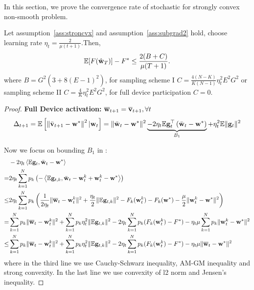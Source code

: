 
In this section, we prove the convergence rate of stochastic for strongly convex
non-smooth problem.


\begin{theorem}
	Let assumption~\ref{ass:stroncvx} and assumption~\ref{ass:subgrad2} hold, choose learning rate $\eta_t = \frac{2}{\mu(t+1)} $.Then,
	\begin{align}
		\mathbb{E}[F(\hat{{\mathbf{w}}}_T)] - F^* \leq \frac{2(B + C)}{\mu(T+1)}.
	\end{align}
	where $B =  G^2 (3  + 8 (E-1)^2)$, for sampling scheme I $C =\frac{4(N - K)}{K(N-1)} \eta_t^2 E^2G^2 $ or
sampling scheme II $C = \frac{4}{K} \eta_t^2 E^2G^2$, for full device participation $C= 0$.
\end{theorem}


\begin{proof}

\textbf{Full Device activation: }  ${\overline{\mathbf{w}}}_{t+1} = {\overline{\mathbf{v}}}_{t+1}, \forall t$ 
\begin{align}
\Delta_{t+1} = \mathbb{E}\left[\left\|\bar{{\mathbf{v}}}_{t+1}-{\mathbf{w}}^{*}\right\|^2| {\mathbf{w}}_{t}\right]=\|\bar{{\mathbf{w}}}_{t}-{\mathbf{w}}^{*}\|^{2} \underbrace{ - 2 \eta_{t} \mathbb{E} {\mathbf{g}}_{t}^{\top}\left(\bar{{\mathbf{w}}}_{t}-{\mathbf{w}}^{*}\right)}_{B_1} + \eta_{t}^{2} \mathbb{E}\| {\mathbf{g}}_{t} \|^{2}	
\label{eq:expand2}
\end{align}


Now we focus on bounding $B_1$ in \eq{\ref{eq:expand}}: 
\begin{align}
	& -2 \eta_{t} \left<\mathbb{E} {\mathbf{g}}_{t}, \bar{{\mathbf{w}}}_{t}-{\mathbf{w}}^{*} \right>\\
  = & 2 \eta_{t} \sum_{k=1}^N p_k \left(-\left<\mathbb{E} {\mathbf{g}}_{t,k}, \bar{{\mathbf{w}}}_{t}-{\mathbf{w}}_t^k + {\mathbf{w}}_t^k - {\mathbf{w}}^{*} \right> \right) \\
  \leq& 2 \eta_{t} \sum_{k=1}^N p_k  \left(\frac{1}{2\eta_t} \|\overline{{\mathbf{w}}}_t - {\mathbf{w}}_t^k\|^2 + \frac{\eta_t}{2} \|\mathbb{E} {\mathbf{g}}_{t,k}\|^2 - F_k({\mathbf{w}}_t^k) - F_k({\mathbf{w}}^*) - \frac{\mu}{2} \|{\mathbf{w}}_t^k - {\mathbf{w}}^*\|^2 \right) \\
  =& \sum_{k=1}^N p_k \|\overline{{\mathbf{w}}}_t - {\mathbf{w}}_t^k\|^2 +  \sum_{k=1}^N p_k \eta_t^2 \|\mathbb{E} {\mathbf{g}}_{t,k}\|^2 
  - 2\eta_t\sum_{k=1}^N p_k (F_k({\mathbf{w}}_t^k) - F^*) - \eta_t \mu \sum_{k=1}^N p_k \|{\mathbf{w}}_t^k - {\mathbf{w}}^*\|^2 \\
  \leq & \sum_{k=1}^N p_k \|\overline{{\mathbf{w}}}_t - {\mathbf{w}}_t^k\|^2 +  \sum_{k=1}^N p_k \eta_t^2 \|\mathbb{E} {\mathbf{g}}_{t,k}\|^2 
  - 2\eta_t\sum_{k=1}^N p_k (F_k({\mathbf{w}}_t^k) - F^*) - \eta_t \mu \|{\overline{\mathbf{w}}}_t- {\mathbf{w}}^*\|^2  \label{eq:scvxnsmth1}
\end{align}
where in the third line we use Cauchy-Schwarz inequality, AM-GM inequality and strong convexity.
In the last line we use convexity of l2 norm and Jensen's inequality.


\end{proof}

